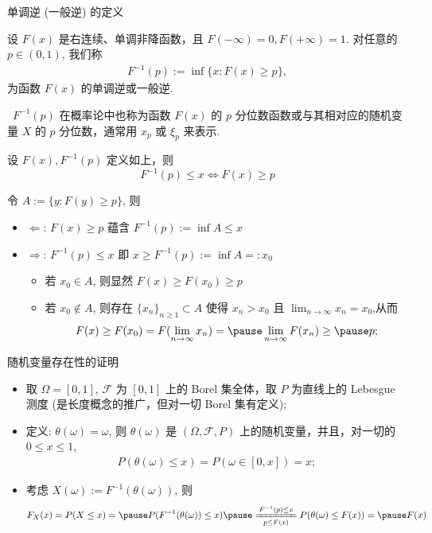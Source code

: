  \begin{frame}{单调逆 (一般逆) 的定义}
	 \vspace{-0.1cm}
	 \begin{defi}
		 设 $F (x)$ 是右连续、单调非降函数，且 $F (-\infty)=0, F (+\infty)=1$. 对任意的 $p\in (0,1)$, 我们称
		 \begin{eqnarray*}
			 F^{-1}(p):=\inf\{x: F(x)\geq p\}, %
		 \end{eqnarray*}
		 为函数 $F (x)$ 的单调逆或一般逆.
	 \end{defi}

 \pause
 \begin{rmk} \ 	 $F^{-1}(p)$ 在概率论中也称为函数 $F (x)$ 的 $p$ 分位数函数或与其相对应的随机变量 $X$ 的 $p$ 分位数，通常用 $x_p$ 或 $\xi_p$ 来表示.
 \end{rmk}
 \begin{thm}
	 设 $F (x), F^{-1}(p)$ 定义如上，则
	 \[F^{-1}(p)\leq x \Leftrightarrow F(x)\ge p \]
 \end{thm}
 \pause
 \zheng 令 $A:=\{y: F (y)\geq p\}$, 则 \pause
 \begin{itemize}[<+-|alert@+>]
	 \item $\Leftarrow$: $F (x)\geq p$ 蕴含 \pause $F^{-1}(p):=\inf A\leq x$\pause
	 \item $\Rightarrow$: $F^{-1}(p)\leq x$ 即 $x\geq F^{-1}(p):=\inf A=:x_0$\pause
	 \begin{itemize}[<+-|alert@+>]
		 \item 若 $x_0\in A$, 则显然 \pause $F (x)\geq F (x_0)\geq p$\pause
		 \item 若 $x_0\notin A$, 则存在 \pause $\{x_n\}_{n\geq 1}\subset A$ 使得 $x_n>x_0$ 且 $\lim_{n\rightarrow \infty} x_n=x_0$,\pause  从而 \pause
		 \[F(x)\geq F(x_0)=F(\lim_{n\rightarrow \infty}x_n)=\pause \lim_{n\rightarrow \infty}F(x_n)\geq\pause p;\]
	 \end{itemize}
 \end{itemize}
 \end{frame}
 \begin{frame}{随机变量存在性的证明}
 \pause
 \begin{itemize}[<+-|alert@+>]
	 \item 取 $\Omega=[0,1]$, $\mathcal{F}$ 为 $[0,1]$ 上的 Borel 集全体，取 $P$ 为直线上的 Lebesgue 测度 (是长度概念的推广，但对一切 Borel 集有定义);
	 \item 定义: $\theta (\omega)=\omega$, 则 $\theta (\omega)$ 是 $(\Omega,\mathcal{F},P)$ 上的随机变量，并且，对一切的 $0\le x\le 1$,
	 \begin{eqnarray*}
		 P(\theta(\omega)\le x)=P(\omega\in[0,x])=x;
	 \end{eqnarray*}
	 \item 考虑 $X (\omega):=F^{-1}(\theta (\omega))$, 则
	{\small\begin{eqnarray*}
			 F_X(x)=P(X\le x)=\pause P(F^{-1}(\theta(\omega))\le x)\pause \xlongequal[p\le F(x)]{F^{-1}(p)\le x} P(\theta(\omega)\le F(x))=\pause F(x)
	 \end{eqnarray*}}


 \end{itemize}


 \end{frame}
